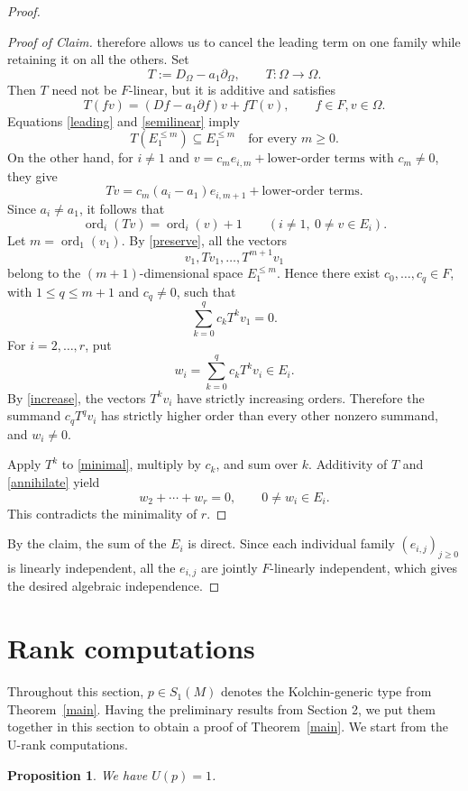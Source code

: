 \documentclass[10pt,a4paper]{amsart}
\newtheorem{proposition}[theorem]{Proposition}
\newcommand{\ord}{\operatorname{ord}}
\begin{document}
\begin{proof}
\begin{proof}[Proof of Claim]
therefore allows us to cancel the leading term on one
family while retaining it on all the others. Set
\[
 T:=D_\Omega-a_1\partial_\Omega, \qquad T:\Omega\longrightarrow \Omega.
\]
Then $T$ need not be $F$-linear, but it is additive and satisfies
\begin{equation}\label{semilinear}
 T(fv)=(Df-a_1\partial f)v+fT(v),\qquad f\in F, v\in \Omega.
\end{equation}
Equations \eqref{leading} and \eqref{semilinear} imply
\begin{equation}\label{preserve}
 T\left(E_1^{\leqslant m}\right)\subseteq E_1^{\leqslant m}
 \quad\text{for every }m\geqslant0.
\end{equation}
On the other hand, for $i\neq1$ and
$v=c_m e_{i,m}+\text{lower-order terms}$ with $c_m\neq0$, they give
\[
 Tv=c_m(a_i-a_1)e_{i,m+1}+\text{lower-order terms}.
\]
Since $a_i\neq a_1$, it follows that
\begin{equation}\label{increase}
 \ord_i(Tv)=\ord_i(v)+1
 \qquad(i\neq1,\ 0\neq v\in E_i).
\end{equation}
Let $m=\ord_1(v_1)$. By \eqref{preserve}, all the vectors
\[
 v_1,Tv_1,\ldots,T^{m+1}v_1
\]
belong to the $(m+1)$-dimensional space $E_1^{\leqslant m}$. Hence there
exist $c_0,\ldots,c_q\in F$, with $1\leqslant q\leqslant m+1$ and $c_q\neq0$,
such that
\begin{equation}\label{annihilate}
 \sum_{k=0}^q c_kT^kv_1=0.
\end{equation}
For $i=2,\ldots,r$, put
\[
 w_i=\sum_{k=0}^q c_kT^kv_i\in E_i.
\]
By \eqref{increase}, the vectors $T^kv_i$ have strictly increasing
orders. Therefore the summand $c_qT^qv_i$ has strictly higher order
than every other nonzero summand, and $w_i\neq0$.

Apply $T^k$ to \eqref{minimal}, multiply by $c_k$, and sum over $k$.
Additivity of $T$ and \eqref{annihilate} yield
\[
 w_2+\cdots+w_r=0,\qquad 0\neq w_i\in E_i.
\]
This contradicts the minimality of $r$.
\end{proof}
By the claim, the sum of the $E_i$ is direct. Since each individual
family $(e_{i,j})_{j\geqslant0}$ is linearly independent, all the
$e_{i,j}$ are jointly $F$-linearly independent, which gives the desired algebraic independence.
\end{proof}

\section{Rank computations}\label{sec3}
Throughout this section, $p\in S_1(M)$ denotes the
Kolchin-generic type from Theorem~\ref{main}. Having the preliminary results from Section 2, we put them together in this section to obtain a proof of Theorem~\ref{main}. We start from the U-rank computations.
\begin{proposition}\label{minimality}
We have $U(p)=1$.
\end{proposition}
\end{document}
